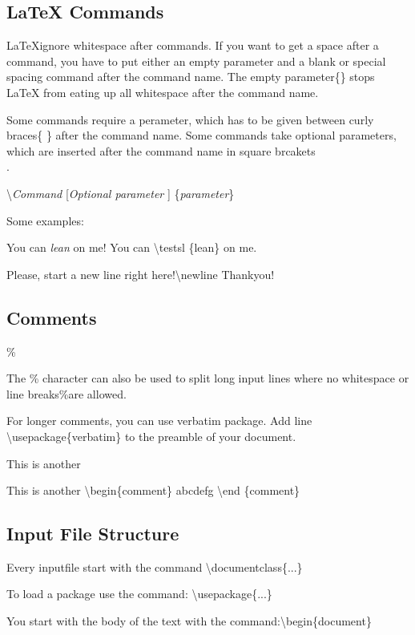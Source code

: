 \documentclass[11pt]{article}
\begin{document}
\subsection{\LaTeX{} Commands}
\LaTeX ignore whitespace after commands. If you want to get a space after a command, you have to put either an empty parameter{} and a blank or special spacing command after the command name. The empty parameter\{\} stops \LaTeX{} from eating up all whitespace after the command name.

Some commands require a perameter, which has to be given between curly braces\{ \} after the command name. Some commands take optional parameters, which are inserted after the command name in square brcakets\[ \].

\textbackslash \emph{Command} [\emph{Optional parameter} ] \{\emph{parameter}\}

Some examples:

You can \textsl{lean} on me! You can \textbackslash testsl \{lean\} on me.

Please, start a new line right here!\textbackslash newline \newline
Thankyou!

\subsection{Comments}

\%

The \% character can also be used to split long input lines where no whitespace or line breaks\%are allowed.

For longer comments, you can use verbatim package. Add line \textbackslash usepackage\{verbatim\} to the preamble of your document.

This is another 

This is another \textbackslash begin\{comment\} abcdefg \textbackslash end \{comment\}

\subsection{Input File Structure}
Every inputfile start with the command \textbackslash documentclass\{...\}

To load a package use the command: \textbackslash usepackage\{...\}

You start with the body of the text with the command:\textbackslash begin\{document\}
\end{document}
